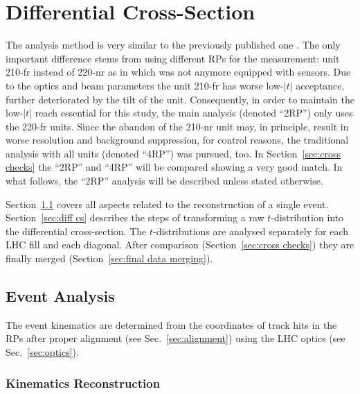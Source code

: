 \section{Differential Cross-Section}
\label{sec:differential cross-section}

The analysis method is very similar to the previously published one \cite{totem-1km}. The only important difference stems from using different RPs for the measurement: unit 210-fr instead of 220-nr as in \cite{totem-1km} which was not anymore equipped with sensors. Due to the optics and beam parameters the unit 210-fr has worse low-$|t|$ acceptance, further deteriorated by the tilt of the unit. Consequently, in order to maintain the low-$|t|$ reach essential for this study, the main analysis (denoted ``2RP'') only uses the 220-fr units. Since the abandon of the 210-nr unit may, in principle, result in worse resolution and background suppression, for control reasons, the traditional analysis with all units (denoted ``4RP'') was pursued, too. In Section~\ref{sec:cross checks} the ``2RP'' and ``4RP'' will be compared showing a very good match. In what follows, the ``2RP'' analysis will be described unless stated otherwise.


Section~\ref{sec:event analysis} covers all aspects related to the reconstruction of a single event. Section~\ref{sec:diff cs} describes the steps of transforming a raw $t$-distribution into the differential cross-section. The $t$-distributions are analysed separately for each LHC fill and each diagonal. After comparison (Section~\ref{sec:cross checks}) they are finally merged (Section~\ref{sec:final data merging}).

\subsection{Event Analysis}
\label{sec:event analysis}

The event kinematics are determined from the coordinates of track hits in the RPs after proper alignment (see Sec.~\ref{sec:alignment}) using the LHC optics (see Sec.~\ref{sec:optics}).


\subsubsection{Kinematics Reconstruction}
\label{sec:kinematics}

